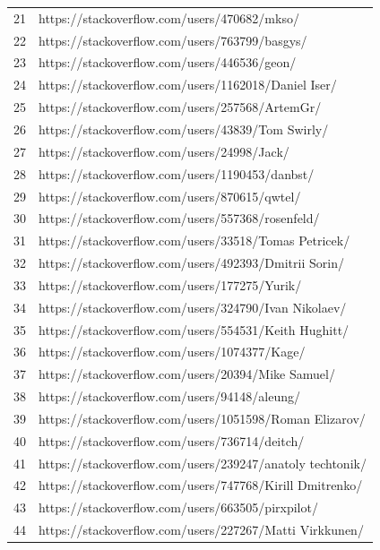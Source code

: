 \begin{center}
\begin{longtable}{|p{1.5cm}|p{12.5cm}|}
            21 & https://stackoverflow.com/users/470682/mkso/ \\
            22 & https://stackoverflow.com/users/763799/basgys/ \\
            23 & https://stackoverflow.com/users/446536/geon/ \\
            24 & https://stackoverflow.com/users/1162018/Daniel Iser/ \\
            25 & https://stackoverflow.com/users/257568/ArtemGr/ \\
            26 & https://stackoverflow.com/users/43839/Tom Swirly/ \\
            27 & https://stackoverflow.com/users/24998/Jack/ \\
            28 & https://stackoverflow.com/users/1190453/danbst/  \\
            29 & https://stackoverflow.com/users/870615/qwtel/  \\
            30 & https://stackoverflow.com/users/557368/rosenfeld/  \\
            31 & https://stackoverflow.com/users/33518/Tomas Petricek/  \\
            32 & https://stackoverflow.com/users/492393/Dmitrii Sorin/  \\
            33 & https://stackoverflow.com/users/177275/Yurik/ \\
            34 & https://stackoverflow.com/users/324790/Ivan Nikolaev/ \\
            35 & https://stackoverflow.com/users/554531/Keith Hughitt/ \\
            36 & https://stackoverflow.com/users/1074377/Kage/ \\
            37 & https://stackoverflow.com/users/20394/Mike Samuel/ \\
            38 & https://stackoverflow.com/users/94148/aleung/ \\
            39 & https://stackoverflow.com/users/1051598/Roman  Elizarov/ \\
            40 & https://stackoverflow.com/users/736714/deitch/ \\
            41 & https://stackoverflow.com/users/239247/anatoly techtonik/ \\
            42 & https://stackoverflow.com/users/747768/Kirill Dmitrenko/ \\
            43 & https://stackoverflow.com/users/663505/pirxpilot/ \\
            44 & https://stackoverflow.com/users/227267/Matti Virkkunen/ \\

\end{longtable}
\end{center}
